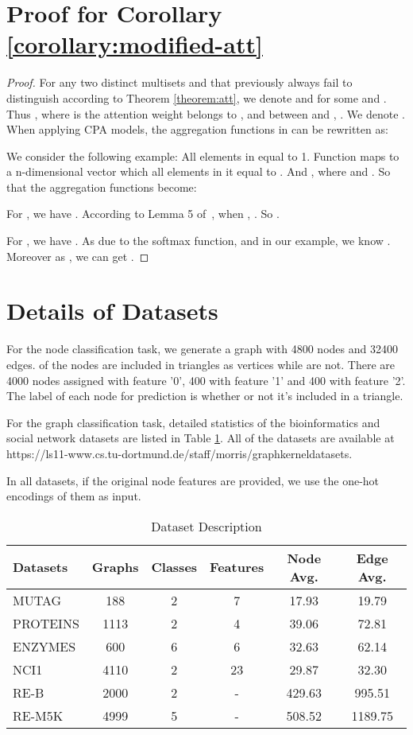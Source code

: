\documentclass[letterpaper]{article} \usepackage{aaai20}  \usepackage{times}  \usepackage{helvet} \usepackage{courier}  \usepackage[hyphens]{url}  \usepackage{graphicx} \urlstyle{rm} \def\UrlFont{\rm}  \usepackage{graphicx}  \frenchspacing  \setlength{\pdfpagewidth}{8.5in}  \setlength{\pdfpageheight}{11in}
\theoremstyle{plain}
\theoremstyle{definition}
\begin{document}
\section{Proof for Corollary \ref{corollary:modified-att}}
\begin{proof}
For any two distinct multisets  and  that  previously always fail to distinguish according to Theorem \ref{theorem:att}, we denote  and  for some  and . Thus , where  is the attention weight belongs to , and between  and , . We denote . When applying CPA models, the aggregation functions in  can be rewritten as:


We consider the following example: All elements in  equal to 1. Function  maps  to a n-dimensional vector which all elements in it equal to . And , where  and . So that the aggregation functions become:


For , we have . According to Lemma 5 of~\cite{xu2018how}, when , . So .

For , we have . As  due to the softmax function, and  in our example, we know . Moreover as , we can get .
\end{proof}

\section{Details of Datasets}

For the node classification task, we generate a graph with 4800 nodes and 32400 edges.  of the nodes are included in triangles as vertices while  are not. There are 4000 nodes assigned with feature '0', 400 with feature '1' and 400 with feature '2'. The label of each node for prediction is whether or not it's included in a triangle.

For the graph classification task, detailed statistics of the bioinformatics and social network datasets are listed in Table \ref{Detail}. All of the datasets are available at https://ls11-www.cs.tu-dortmund.de/staff/morris/graphkerneldatasets.

In all datasets, if the original node features are provided, we use the one-hot encodings of them as input.

\begin{table}[H]
\centering
\scriptsize
\caption{Dataset Description} \label{Detail}
\smallskip
\begin{tabular}{lccccc}
\toprule
Datasets  &{Graphs}&{Classes}&{Features}&{Node Avg.}&{Edge Avg.}\\
\midrule
{MUTAG}    & 188   & 2  & 7  & 17.93  & 19.79 \\
{PROTEINS} & 1113  & 2  & 4  & 39.06  & 72.81\\
{ENZYMES}  & 600   & 6  & 6  & 32.63  & 62.14 \\
{NCI1}     & 4110  & 2  & 23 & 29.87  & 32.30 \\
{RE-B}     & 2000  & 2  & -  & 429.63 & 995.51 \\
{RE-M5K}   & 4999  & 5  & -  & 508.52 & 1189.75 \\
\bottomrule
\end{tabular}
\end{table}
\end{document}
